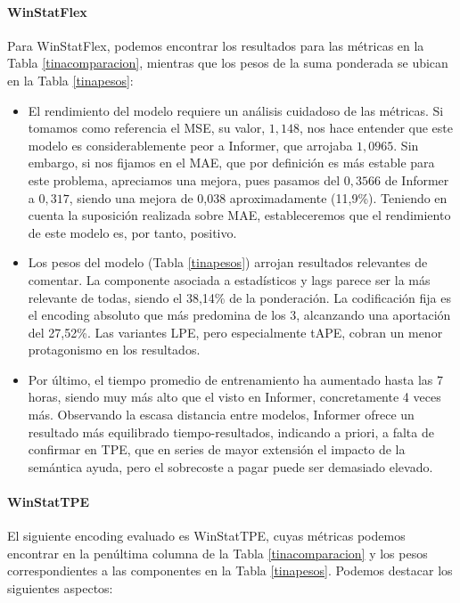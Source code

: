 \paragraph{WinStatFlex}

Para WinStatFlex, podemos encontrar los resultados para las métricas en la Tabla \ref{tinacomparacion}, mientras que los pesos de la suma ponderada se ubican en la Tabla \ref{tinapesos}:

\begin{itemize}
	\item El rendimiento del modelo requiere un análisis cuidadoso de las métricas. Si tomamos como referencia el MSE, su valor, $1,148$, nos hace entender que este modelo es considerablemente peor a Informer, que arrojaba $1,0965$. Sin embargo, si nos fijamos en el MAE, que por definición es más estable para este problema, apreciamos una mejora, pues pasamos del $0,3566$ de Informer a $0,317$, siendo una mejora de 0,038 aproximadamente (11,9\%). Teniendo en cuenta la suposición realizada sobre MAE, estableceremos que el rendimiento de este modelo es, por tanto, positivo.
	
	\item Los pesos del modelo (Tabla \ref{tinapesos}) arrojan resultados relevantes de comentar. La componente asociada a estadísticos y lags parece ser la más relevante de todas, siendo el 38,14\% de la ponderación. La codificación fija es el encoding absoluto que más predomina de los 3, alcanzando una aportación del 27,52\%. Las variantes LPE, pero especialmente tAPE, cobran un menor protagonismo en los resultados.
	
	\item Por último, el tiempo promedio de entrenamiento ha aumentado hasta las 7 horas, siendo muy más alto que el visto en Informer, concretamente 4 veces más. Observando la escasa distancia entre modelos, Informer ofrece un resultado más equilibrado tiempo-resultados, indicando a priori, a falta de confirmar en TPE, que en series de mayor extensión el impacto de la semántica ayuda, pero el sobrecoste a pagar puede ser demasiado elevado.
\end{itemize}
 
\paragraph{WinStatTPE}

El siguiente encoding evaluado es WinStatTPE, cuyas métricas podemos encontrar en la penúltima columna de la Tabla \ref{tinacomparacion} y los pesos correspondientes a las componentes en la Tabla \ref{tinapesos}. Podemos destacar los siguientes aspectos:

